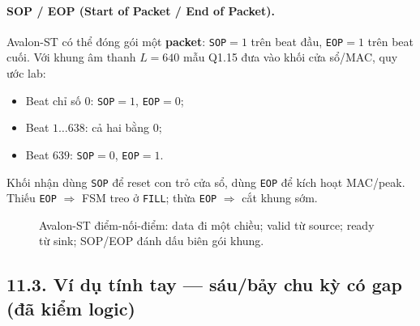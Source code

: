 \paragraph{SOP / EOP (Start of Packet / End of Packet).}
Avalon-ST có thể đóng gói một \textbf{packet}: \texttt{SOP}$=1$ trên beat đầu, \texttt{EOP}$=1$ trên beat cuối. Với khung âm thanh $L=640$ mẫu Q1.15 đưa vào khối cửa sổ/MAC, quy ước lab:
\begin{itemize}[leftmargin=1.4em]
    \item Beat chỉ số $0$: \texttt{SOP}$=1$, \texttt{EOP}$=0$;
    \item Beat $1\ldots 638$: cả hai bằng $0$;
    \item Beat $639$: \texttt{SOP}$=0$, \texttt{EOP}$=1$.
\end{itemize}
Khối nhận dùng \texttt{SOP} để reset con trỏ cửa sổ, dùng \texttt{EOP} để kích hoạt MAC/peak. Thiếu \texttt{EOP} $\Rightarrow$ FSM treo ở \texttt{FILL}; thừa \texttt{EOP} $\Rightarrow$ cắt khung sớm.

\begin{figure}[H]
\centering
{}
\caption{Avalon-ST điểm-nối-điểm: data đi một chiều; valid từ source; ready từ sink; SOP/EOP đánh dấu biên gói khung.}
\label{fig:ch11_avalon_st}
\end{figure}

\subsection*{11.3. Ví dụ tính tay --- sáu/bảy chu kỳ có gap (đã kiểm logic)}

